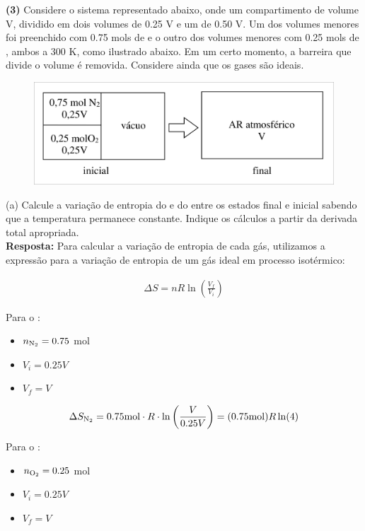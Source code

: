 \textbf{(3)} Considere o sistema representado abaixo, onde um compartimento de
volume V, dividido em dois volumes de \num{0,25} V e um de \num{0,50} V. Um dos volumes
menores foi preenchido com \num{0,75} mols de  e o outro dos volumes menores com
\num{0,25} mols de , ambos a 300 K, como ilustrado abaixo. Em um certo momento, a
barreira que divide o volume é removida.  Considere ainda que os gases são
ideais.\\

\begin{figure}[H]
    \centering
    \includegraphics[width=.8\linewidth]{Q3.png}
\end{figure}

(a) Calcule a variação de entropia do  e do  entre os estados
final e inicial sabendo que a temperatura permanece constante. Indique os
cálculos a partir da derivada total apropriada.\\

    \textbf{Resposta:} Para calcular a variação de entropia de cada gás, utilizamos a expressão para a variação de entropia de um gás ideal em processo isotérmico:

    \begin{align*}
    \Delta S = nR \ln\left(\frac{V_f}{V_i}\right)
    \end{align*}
    
    Para o :
    \begin{itemize}
        \item $n_{\ce{N2}} = \num{0,75}$ mol
        \item $V_i = \num{0,25}V$
        \item $V_f = V$
    \end{itemize}
    
    \begin{align*}
        \Delta S_{\ce{N2}} = \num{0,75}\unit{mol} \cdot R \cdot
        \ln\left(\frac{V}{\num{0,25}V}\right) = (\num{0,75}\unit{mol})R\ln(4)
    \end{align*}

    Para o :
    \begin{itemize}
        \item $n_{\ce{O2}} = \num{0,25}$ mol
        \item $V_i = \num{0,25}V$
        \item $V_f = V$
    \end{itemize}
    
